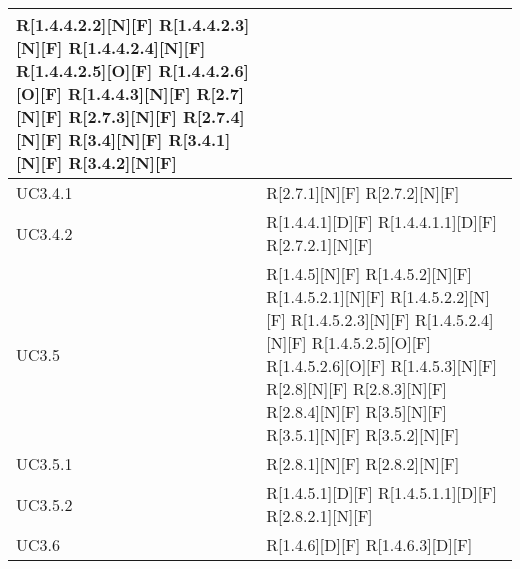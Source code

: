 \begin{longtable}{X | X}
R[1.4.4.2.2][N][F] \newline
R[1.4.4.2.3][N][F] \newline
R[1.4.4.2.4][N][F] \newline
R[1.4.4.2.5][O][F] \newline
R[1.4.4.2.6][O][F] \newline
R[1.4.4.3][N][F] \newline
R[2.7][N][F] \newline
R[2.7.3][N][F] \newline
R[2.7.4][N][F] \newline
R[3.4][N][F] \newline
R[3.4.1][N][F] \newline
R[3.4.2][N][F]  \\
\hline
UC3.4.1 & R[2.7.1][N][F] \newline
R[2.7.2][N][F]  \\
\hline
UC3.4.2 & R[1.4.4.1][D][F] \newline
R[1.4.4.1.1][D][F] \newline
R[2.7.2.1][N][F]  \\
\hline
UC3.5 & R[1.4.5][N][F] \newline
R[1.4.5.2][N][F] \newline
R[1.4.5.2.1][N][F] \newline
R[1.4.5.2.2][N][F] \newline
R[1.4.5.2.3][N][F] \newline
R[1.4.5.2.4][N][F] \newline
R[1.4.5.2.5][O][F] \newline
R[1.4.5.2.6][O][F] \newline
R[1.4.5.3][N][F] \newline
R[2.8][N][F] \newline
R[2.8.3][N][F] \newline
R[2.8.4][N][F] \newline
R[3.5][N][F] \newline
R[3.5.1][N][F] \newline
R[3.5.2][N][F]  \\
\hline
UC3.5.1 & R[2.8.1][N][F] \newline
R[2.8.2][N][F]  \\
\hline
UC3.5.2 & R[1.4.5.1][D][F] \newline
R[1.4.5.1.1][D][F] \newline
R[2.8.2.1][N][F]  \\
\hline
UC3.6 & R[1.4.6][D][F] \newline
R[1.4.6.3][D][F] \newline

\end{longtable}
